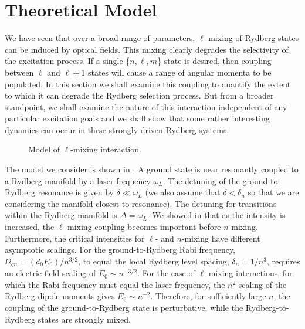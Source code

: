 \section{Theoretical Model}
\label{theory}
\hspace{\parindent}  We have seen that over a broad range of parameters,
$\ell$-mixing of Rydberg states can be induced by optical fields.  This mixing
clearly degrades the selectivity of the excitation process. If a single
\{$n,\ell,m$\} state is desired, then coupling between $\ell$ and $\ell \pm
1$ states will cause a range of angular momenta to be populated.  In this
section we shall examine this coupling to quantify the extent to which it
can degrade the Rydberg selection process.  But from a broader standpoint,
we shall examine the nature of this interaction independent of any
particular excitation goals and we shall show that some rather interesting
dynamics can occur in these strongly driven Rydberg systems.

\begin{figure}[tbp]
\bigskip
{} {Model of $\ell$-mixing interaction.
\label{mix_levels}}
\end{figure}

The model we consider is shown in .  A ground state is
near resonantly coupled to a Rydberg manifold by a laser frequency
$\omega_L$.  The detuning of the ground-to-Rydberg resonance is given by
$\delta \ll \omega_L$ (we also assume that $\delta < \delta_n$ so that
we are considering the manifold closest to resonance).  The detuning for
transitions within the Rydberg manifold is
$\Delta = \omega_L$.  We showed in  that as the intensity is increased, the
$\ell$-mixing coupling becomes important before $n$-mixing.  Furthermore,
the critical intensities for $\ell$- and $n$-mixing have different
asymptotic scalings.  For the ground-to-Rydberg Rabi frequency, $\Omega_{gn}
= (d_0 E_0)/n^{3/2}$, to equal the local Rydberg level spacing, $\delta_n =
1/n^3$, requires an electric field scaling of $E_0 \sim n^{-3/2}$.  For the
case of $\ell$-mixing interactions, for which the Rabi frequency must equal the
laser frequency, the $n^2$ scaling of the Rydberg dipole moments gives $E_0
\sim n^{-2}$.  Therefore, for sufficiently large $n$, the
coupling of the ground-to-Rydberg state is perturbative, while the
Rydberg-to-Rydberg states are strongly mixed.


